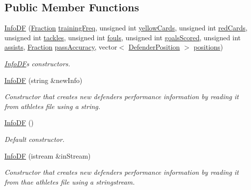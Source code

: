 \subsection*{Public Member Functions}
\begin{DoxyCompactItemize}
\item 
\hyperlink{class_info_d_f_af55f2bb64e046196f749756e4d5f8112}{Info\+DF} (\hyperlink{class_fraction}{Fraction} \hyperlink{class_info_ae893be5aad319de5d911c3f80cc0a2d4}{training\+Freq}, unsigned int \hyperlink{class_info_aabdfdb282f3ceaae1772574bf2b3cd86}{yellow\+Cards}, unsigned int \hyperlink{class_info_a953c30accc7e6ff301542adfd5824f38}{red\+Cards}, unsigned int \hyperlink{class_info_aecdd57d96490b16a0c2590dd8f34009e}{tackles}, unsigned int \hyperlink{class_info_a2f90c84ba67c0e225dd58cdc14ab7f3d}{fouls}, unsigned int \hyperlink{class_info_a5ad5f72833856502b9c1f6ea50a98619}{goals\+Scored}, unsigned int \hyperlink{class_info_a1c0340af11df3407946b0ffdaae28864}{assists}, \hyperlink{class_fraction}{Fraction} \hyperlink{class_info_a37ee53dc8ae9a9656206e7eb389c6392}{pass\+Accuracy}, vector$<$ \hyperlink{_utils_8hpp_a94ee089ecd5db12c81c7edbefaabff4d}{Defender\+Position} $>$ \hyperlink{class_info_d_f_ae694b60f6efc0190b16a99748b0eca40}{positions})
\begin{DoxyCompactList}\small\item\em \hyperlink{class_info_d_f}{Info\+DF}\textquotesingle{}s constructors. \end{DoxyCompactList}\item 
\hyperlink{class_info_d_f_abc2533cd09063a1bd3c70c82ab1a4f70}{Info\+DF} (string \&new\+Info)
\begin{DoxyCompactList}\small\item\em Constructor that creates new defender\textquotesingle{}s performance information by reading it from athletes file using a string. \end{DoxyCompactList}\item 
\hyperlink{class_info_d_f_a4643516a0a0ba1b391ff35f6267abdf2}{Info\+DF} ()
\begin{DoxyCompactList}\small\item\em Default constructor. \end{DoxyCompactList}\item 
\hyperlink{class_info_d_f_a54560987e55966335300ba6a3034c926}{Info\+DF} (istream \&in\+Stream)
\begin{DoxyCompactList}\small\item\em Constructor that creates new defender\textquotesingle{}s performance information by reading it from thae athletes file using a stringstream. \end{DoxyCompactList}\item 

\end{DoxyCompactItemize}
